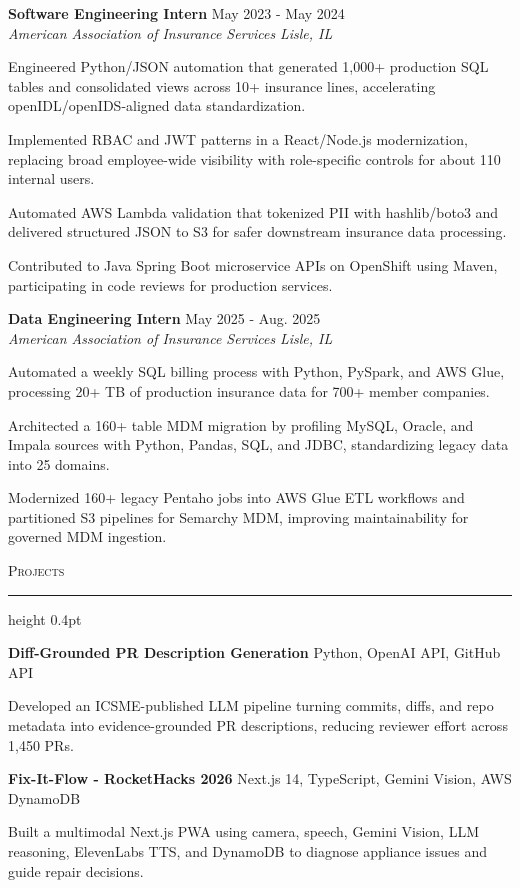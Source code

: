 \documentclass[letterpaper,11pt]{article}
\newcommand{\resumesection}[1]{%
  \par\vspace{2pt}%
  {\large\scshape #1}\par\vspace{2pt}%
  \hrule height 0.4pt\vspace{2pt}%
}
\newcommand{\resumeSubheading}[4]{
  \textbf{#1} \hfill #2\\
  \textit{#3} \hfill \textit{#4}
}
\newcommand{\projectHeading}[2]{
  \textbf{#1} \hfill #2
}
\begin{document}
\resumeSubheading
{Software Engineering Intern}{May 2023 - May 2024}
{American Association of Insurance Services}{Lisle, IL}
\begin{tightitemize}
  \item Engineered Python/JSON automation that generated 1,000+ production SQL tables and consolidated views across 10+ insurance lines, accelerating openIDL/openIDS-aligned data standardization.
  \item Implemented RBAC and JWT patterns in a React/Node.js modernization, replacing broad employee-wide visibility with role-specific controls for about 110 internal users.
  \item Automated AWS Lambda validation that tokenized PII with hashlib/boto3 and delivered structured JSON to S3 for safer downstream insurance data processing.
  \item Contributed to Java Spring Boot microservice APIs on OpenShift using Maven, participating in code reviews for production services.
\end{tightitemize}

\resumeSubheading
{Data Engineering Intern}{May 2025 - Aug. 2025}
{American Association of Insurance Services}{Lisle, IL}
\begin{tightitemize}
  \item Automated a weekly SQL billing process with Python, PySpark, and AWS Glue, processing 20+ TB of production insurance data for 700+ member companies.
  \item Architected a 160+ table MDM migration by profiling MySQL, Oracle, and Impala sources with Python, Pandas, SQL, and JDBC, standardizing legacy data into 25 domains.
  \item Modernized 160+ legacy Pentaho jobs into AWS Glue ETL workflows and partitioned S3 pipelines for Semarchy MDM, improving maintainability for governed MDM ingestion.
\end{tightitemize}

\resumesection{Projects}
\projectHeading{Diff-Grounded PR Description Generation}{Python, OpenAI API, GitHub API}
\begin{tightitemize}
  \item Developed an ICSME-published LLM pipeline turning commits, diffs, and repo metadata into evidence-grounded PR descriptions, reducing reviewer effort across 1,450 PRs.
\end{tightitemize}

\vspace{-4pt}
\projectHeading{Fix-It-Flow - RocketHacks 2026}{Next.js 14, TypeScript, Gemini Vision, AWS DynamoDB}
\begin{tightitemize}
  \item Built a multimodal Next.js PWA using camera, speech, Gemini Vision, LLM reasoning, ElevenLabs TTS, and DynamoDB to diagnose appliance issues and guide repair decisions.
\end{tightitemize}
\end{document}
